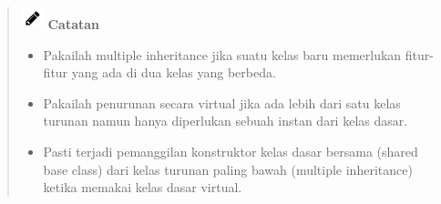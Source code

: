 \begin{quotation}
\includegraphics{../manuscript/images/pencil}	\textbf{Catatan}
	\begin{itemize}
		\item Pakailah multiple inheritance jika suatu kelas baru memerlukan
		fitur-fitur yang ada di dua kelas yang berbeda.
		\item Pakailah penurunan secara virtual jika ada lebih dari satu kelas turunan
		namun hanya diperlukan sebuah instan dari kelas dasar.
		\item Pasti terjadi pemanggilan konstruktor kelas dasar bersama (shared base
		class) dari kelas turunan paling bawah (multiple inheritance) ketika
		memakai kelas dasar virtual.
	\end{itemize}
\end{quotation}
 

